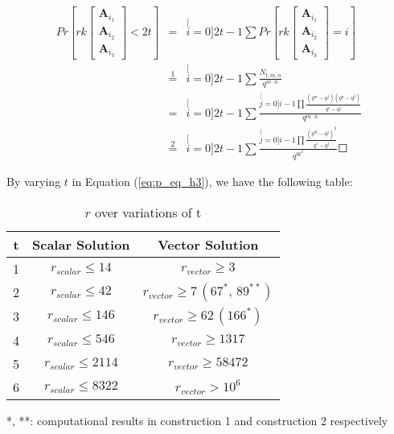 \begin{eqnarray}
Pr\left[rk\left[\begin{array}{c}
\boldsymbol{A}_{i_{1}}\\
\boldsymbol{A}_{i_{2}}\\
\boldsymbol{A}_{i_{3}}
\end{array}\right]<2t\right] & = & \stackrel[i=0]{2t-1}{\mathop{\sum}}Pr\left[rk\left[\begin{array}{c}
\boldsymbol{A}_{i_{1}}\\
\boldsymbol{A}_{i_{2}}\\
\boldsymbol{A}_{i_{3}}
\end{array}\right]=i\right]\nonumber \\
 & \overset{1}{=} & \stackrel[i=0]{2t-1}{\mathop{\sum}}\frac{N_{t,m,n}}{q^{m\cdot n}}\nonumber \\
 & = & \stackrel[i=0]{2t-1}{\mathop{\sum}}\frac{\stackrel[j=0]{i-1}{\mathop{\prod}}\frac{\left(q^{m}-q^{j}\right)\left(q^{n}-q^{j}\right)}{q^{i}-q^{j}}}{q^{m\cdot n}}\nonumber \\
 & \overset{2}{=} & \stackrel[i=0]{2t-1}{\mathop{\sum}}\frac{\stackrel[j=0]{i-1}{\mathop{\prod}}\frac{\left(q^{3t}-q^{j}\right)^{2}}{q^{i}-q^{j}}}{q^{9t^{2}}}\Square\label{eq:p_eq_h3}
\end{eqnarray}

By varying $t$ in Equation (\ref{eq:p_eq_h3}), we have the following
table:

\begin{table}[H]
\caption{$r$ over variations of t\label{tab:r_over_t}}

\begin{centering}
\begin{tabular}{|c|c|c|}
\hline 
t & Scalar Solution & Vector Solution\tabularnewline
\hline 
\hline 
1 & $r_{scalar}\leq14$ & $r_{vector}\geq3$\tabularnewline
\hline 
2 & $r_{scalar}\leq42$ & $r_{vector}\geq7\,\left(67^{*},\,89^{**}\right)$\tabularnewline
\hline 
3 & $r_{scalar}\leq146$ & $r_{vector}\geq62\,\left(166^{*}\right)$ \tabularnewline
\hline 
4 & $r_{scalar}\leq546$ & $r_{vector}\geq1317$\tabularnewline
\hline 
5 & $r_{scalar}\leq2114$ & $r_{vector}\geq58472$\tabularnewline
\hline 
6 & $r_{scalar}\leq8322$ & $r_{vector}>10^{6}$\tabularnewline
\hline 
\end{tabular}
\par\end{centering}
{*}, {*}{*}: computational results in construction 1 and construction
2 respectively
\end{table}

